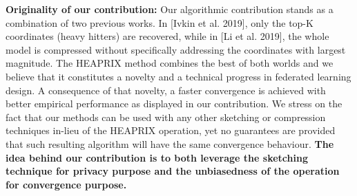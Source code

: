 \documentclass{article}
\begin{document}
\textbf{Originality of our contribution:} 
Our algorithmic contribution stands as a combination of two previous works. 
In [Ivkin et al. 2019], only the top-K coordinates (heavy hitters) are recovered, while in [Li et al. 2019], the whole model is compressed without specifically addressing the coordinates with largest magnitude. 
The HEAPRIX method combines the best of both worlds and we believe that it constitutes a novelty and a technical progress in federated learning design.
A consequence of that novelty, a faster convergence is achieved with better empirical performance as displayed in our contribution.
We stress on the fact that our methods can be used with any other sketching or compression techniques in-lieu of the HEAPRIX operation, yet no guarantees are provided that such resulting algorithm will have the same convergence behaviour.
\textbf{The idea behind our contribution is to both leverage the sketching technique for privacy purpose and the unbiasedness of the operation for convergence purpose.}
\end{document}
